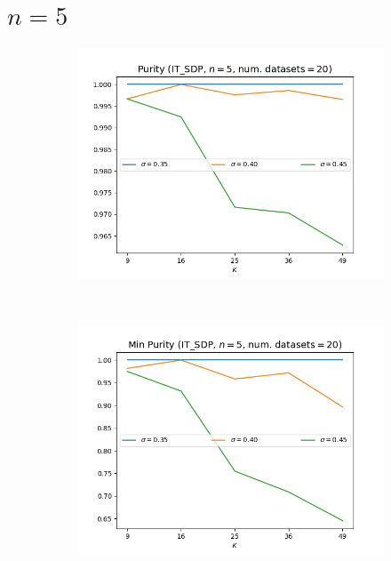 \documentclass{article}
\begin{document}
\section{$n = 5$}
    \begin{figure}[h!]
        \centering
        \begin{subfigure}[t]{0.3\textwidth}
            \centering
            \includegraphics[width=\textwidth]{3/Purity.png}
            \caption{}
        \end{subfigure}%
        ~ 
        \begin{subfigure}[t]{0.3\textwidth}
            \centering
            \includegraphics[width=\textwidth]{3/MinPurity.png}
            \caption{}
        \end{subfigure}

\end{figure}
\end{document}
